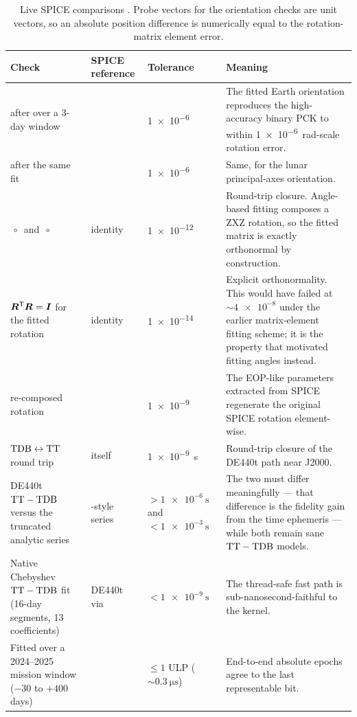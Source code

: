 \begin{table}[htbp]
  \centering
  \caption{Live SPICE comparisons \citep{acton1996spice}. Probe vectors for
    the orientation checks are unit vectors, so an absolute position
    difference is numerically equal to the rotation-matrix element error.}
  \label{tab:xval-spice}
  \scriptsize
  \begin{tabularx}{\textwidth}{@{}L L l L@{}}
    \toprule
    Check & SPICE reference & Tolerance & Meaning \\
    \midrule
     after  over a 3-day window &
       &
      \num{1e-6} &
      The fitted Earth orientation reproduces the high-accuracy binary PCK to
      within \SI{1e-6}{\radian}-scale rotation error. \\
     after the same fit &
       &
      \num{1e-6} &
      Same, for the lunar principal-axes orientation. \\
    $\,\circ\,$ and
      $\,\circ\,$ &
      identity &
      \num{1e-12} &
      Round-trip closure. Angle-based fitting composes a ZXZ rotation, so the
      fitted matrix is exactly orthonormal by construction. \\
    $\bm{R}^{\mathsf{T}} \bm{R} = \bm{I}$ for the fitted rotation &
      identity &
      \num{1e-14} &
      Explicit orthonormality. This would have failed at ${\sim}\num{4e-8}$
      under the earlier matrix-element fitting scheme; it is the property that
      motivated fitting angles instead. \\
     re-composed rotation &
       &
      \num{1e-9} &
      The EOP-like parameters extracted from SPICE regenerate the original
      SPICE rotation element-wise. \\
     $\mathrm{TDB} \leftrightarrow \mathrm{TT}$ round trip &
      itself &
      \SI{1e-9}{\second} &
      Round-trip closure of the DE440t path near J2000. \\
    DE440t $\mathrm{TT}-\mathrm{TDB}$ versus the truncated analytic series &
      -style series &
      $> \SI{1e-6}{\second}$ and $< \SI{1e-3}{\second}$ &
      The two must differ meaningfully --- that difference is the fidelity
      gain from the time ephemeris --- while both remain sane $\mathrm{TT}-\mathrm{TDB}$
      models. \\
    Native Chebyshev $\mathrm{TT}-\mathrm{TDB}$ fit (16-day segments, 13 coefficients) &
      DE440t via  &
      $< \SI{1e-9}{\second}$ &
      The thread-safe fast path is sub-nanosecond-faithful to the kernel. \\
    Fitted  over a 2024--2025 mission window ($-30$ to $+400$ days) &
       &
      $\leq 1$ ULP (${\sim}\SI{0.3}{\micro\second}$) &
      End-to-end absolute epochs agree to the last representable bit. \\
    \bottomrule
  \end{tabularx}
\end{table}

